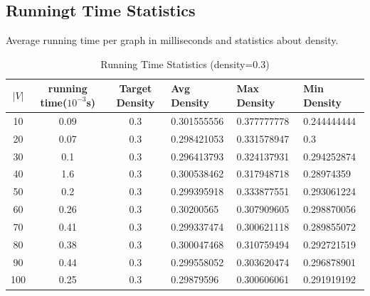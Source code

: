 \documentclass[paper=a4, fontsize=11pt]{scrartcl} %
\numberwithin{equation}{section} %
\numberwithin{figure}{section} %
\numberwithin{table}{section} %
\begin{document}
\newpage
\subsection{Runningt Time Statistics}
Average running time per graph in milliseconds and statistics about density.

\begin{table}[H]
    \centering
    \begin{tabular}{ccclll}
    \toprule
$|V|$ & running time($10^{-3}$s) & Target Density & Avg Density & Max Density & Min Density\\ 
       \midrule
10 & 0.09 & 0.3 & 0.301555556 & 0.377777778 & 0.244444444\\ 
20 & 0.07 & 0.3 & 0.298421053 & 0.331578947 & 0.3\\ 
30 & 0.1 & 0.3 & 0.296413793 & 0.324137931 & 0.294252874\\ 
40 & 1.6 & 0.3 & 0.300538462 & 0.317948718 & 0.28974359\\ 
50 & 0.2 & 0.3 & 0.299395918 & 0.333877551 & 0.293061224\\ 
60 & 0.26 & 0.3 & 0.30200565 & 0.307909605 & 0.298870056\\ 
70 & 0.41 & 0.3 & 0.299337474 & 0.300621118 & 0.289855072\\ 
80 & 0.38 & 0.3 & 0.300047468 & 0.310759494 & 0.292721519\\ 
90 & 0.44 & 0.3 & 0.299558052 & 0.303620474 & 0.296878901\\ 
100 & 0.25 & 0.3 & 0.29879596 & 0.300606061 & 0.291919192\\ 
      \bottomrule
    \end{tabular}
    \caption{Running Time Statistics (density=0.3)}
    \label{tab:running time (density=0.3)}
\end{table}
\end{document}
